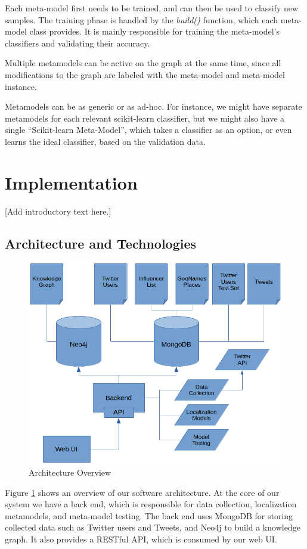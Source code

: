 \documentclass[10pt,a4paper]{article}
\begin{document}
Each meta-model first needs to be trained, and can then be used to classify new samples. The training phase is handled by the \textit{build()} function, which each meta-model class provides. It is mainly responsible for training the meta-model's classifiers and validating their accuracy.

Multiple metamodels can be active on the graph at the same time, since all modifications to the graph are labeled with the meta-model and meta-model instance.

Metamodels can be as generic or as ad-hoc. For instance, we might have separate metamodels for each relevant scikit-learn classifier, but we might also have a single “Scikit-learn Meta-Model”, which takes a classifier as an option, or even learns the ideal classifier, based on the validation data.

\section{Implementation}
[Add introductory text here.]

\subsection{Architecture and Technologies}
\begin{figure}
	\centering
	\includegraphics[scale=0.45]{architecture_overview}
	\caption{Architecture Overview}
	\label{fig:architecture-overview}
\end{figure}

Figure \ref{fig:architecture-overview} shows an overview of our software architecture. At the core of our system we have a back end, which is responsible for data collection, localization metamodels, and meta-model testing. The back end uses MongoDB for storing collected data such as Twitter users and Tweets, and Neo4j to build a knowledge graph. It also provides a RESTful API, which is consumed by our web UI.
\end{document}
